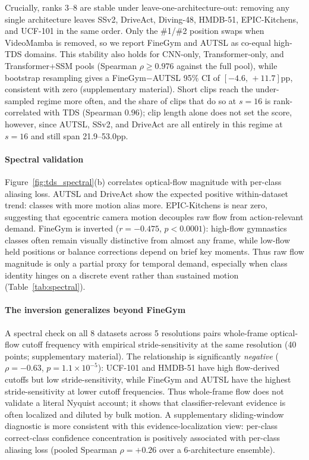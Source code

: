 \documentclass[a4paper, 10pt, conference]{ieeeconf}
\newcommand{\TDS}{\textsc{TDS}}
\begin{document}
Crucially, ranks 3--8 are stable under leave-one-architecture-out: removing any single architecture leaves SSv2, DriveAct, Diving-48, HMDB-51, EPIC-Kitchens, and UCF-101 in the same order. Only the \#1/\#2 position swaps when VideoMamba is removed, so we report FineGym and AUTSL as co-equal high-\TDS{} domains. This stability also holds for CNN-only, Transformer-only, and Transformer+SSM pools (Spearman $\rho\geq0.976$ against the full pool), while bootstrap resampling gives a FineGym$-$AUTSL 95\% CI of $[-4.6,\,+11.7]$pp, consistent with zero (supplementary material). Short clips reach the under-sampled regime more often, and the share of clips that do so at $s{=}16$ is rank-correlated with \TDS{} (Spearman $0.96$); clip length alone does not set the score, however, since AUTSL, SSv2, and DriveAct are all entirely in this regime at $s{=}16$ and still span 21.9--53.0pp.

\paragraph{Spectral validation}
Figure~\ref{fig:tds_spectral}(b) correlates optical-flow magnitude with per-class aliasing loss. AUTSL and DriveAct show the expected positive within-dataset trend: classes with more motion alias more. EPIC-Kitchens is near zero, suggesting that egocentric camera motion decouples raw flow from action-relevant demand. FineGym is inverted ($r=-0.475$, $p<0.0001$): high-flow gymnastics classes often remain visually distinctive from almost any frame, while low-flow held positions or balance corrections depend on brief key moments. Thus raw flow magnitude is only a partial proxy for temporal demand, especially when class identity hinges on a discrete event rather than sustained motion (Table~\ref{tab:spectral}).

\paragraph{The inversion generalizes beyond FineGym} A spectral check on all 8 datasets across 5 resolutions pairs whole-frame optical-flow cutoff frequency with empirical stride-sensitivity at the same resolution (40 points; supplementary material). The relationship is significantly \emph{negative} ($\rho=-0.63$, $p=1.1{\times}10^{-5}$): UCF-101 and HMDB-51 have high flow-derived cutoffs but low stride-sensitivity, while FineGym and AUTSL have the highest stride-sensitivity at lower cutoff frequencies. Thus whole-frame flow does not validate a literal Nyquist account; it shows that classifier-relevant evidence is often localized and diluted by bulk motion. A supplementary sliding-window diagnostic is more consistent with this evidence-localization view: per-class correct-class confidence concentration is positively associated with per-class aliasing loss (pooled Spearman $\rho=+0.26$ over a 6-architecture ensemble).
\end{document}
